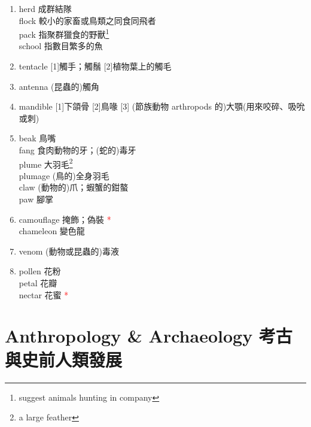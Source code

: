 \documentclass[twoside,b5paper]{book}
\begin{document}
\begin{enumerate}
    \item
      herd 成群結隊\\
      flock 較小的家畜或鳥類之同食同飛者\\
      pack 指聚群獵食的野獸\footnote{suggest animals hunting in company}\\
      school 指數目繁多的魚\\
    \item
      tentacle [1]觸手；觸鬚 [2]植物葉上的觸毛
    \item
      antenna  (昆蟲的)觸角
    \item
      mandible  [1]下頜骨 [2]鳥喙 [3] (節族動物 arthropods 的)大顎(用來咬碎、吸吮或刺)
    \item
      beak  鳥嘴\\
      fang 食肉動物的牙；(蛇的)毒牙\\
      plume  大羽毛\footnote{a large feather}\\
      plumage  (鳥的)全身羽毛\\
      claw  (動物的)爪；蝦蟹的鉗螯\\
      paw  腳掌
    \item
      camouflage  掩飾；偽裝 \textcolor{red}{*}\\
      chameleon  變色龍
    \item
      venom  (動物或昆蟲的)毒液
    \item
      pollen  花粉\\
      petal  花瓣\\
      nectar  花蜜 \textcolor{red}{*}
  \end{enumerate}

  \chapter{Anthropology \& Archaeology 考古與史前人類發展}
\end{document}
